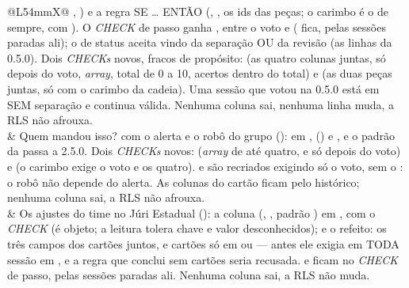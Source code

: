 \begin{tabularx}{\linewidth}{@{}L{54mm}X@{}}
  , ) e a regra SE \ldots{}
  ENTÃO (, , os ids das peças; o carimbo é o
   de sempre, com ). O
  \emph{CHECK} de passo ganha , entre o voto e
   ( fica, pelas sessões paradas ali); o de status
  aceita  vindo da separação OU da revisão (as linhas
  da 0.5.0). Dois \emph{CHECKs} novos, fracos de propósito:
   (as quatro colunas juntas, só
  depois do voto, \emph{array}, total de 0 a 10, acertos dentro do total) e
   (as duas peças juntas, só com o
  carimbo da cadeia). Uma sessão que votou na 0.5.0 está em  SEM
  separação e continua válida. Nenhuma coluna sai, nenhuma linha muda, a RLS
  não afrouxa.\\
 & Quem mandou
  isso? com o alerta e o robô do grupo (): em
  ,  ()
  e , e o padrão da  passa a 2.5.0.
  Dois \emph{CHECKs} novos: 
  (\emph{array} de até quatro, e só depois do voto) e
   (o carimbo exige o
  voto e os quatro). 
  e  são recriados exigindo
  só o voto, sem o : o robô não depende do alerta. As
  colunas do cartão ficam pelo histórico; nenhuma coluna sai, a RLS não
  afrouxa.\\
 & Os ajustes do
  time no Júri Estadual (): a coluna  (,
  , padrão ) em , com o
  \emph{CHECK}  (é objeto; a
  leitura tolera chave e valor desconhecidos); e o
   refeito: os três campos dos
  cartões juntos, e cartões só em  ou  --- antes ele
  exigia  em TODA sessão em , e a regra que conclui
  sem cartões seria recusada.  e  ficam no
  \emph{CHECK} de passo, pelas sessões paradas ali. Nenhuma coluna sai, a RLS
  não muda.\\

\end{tabularx}
